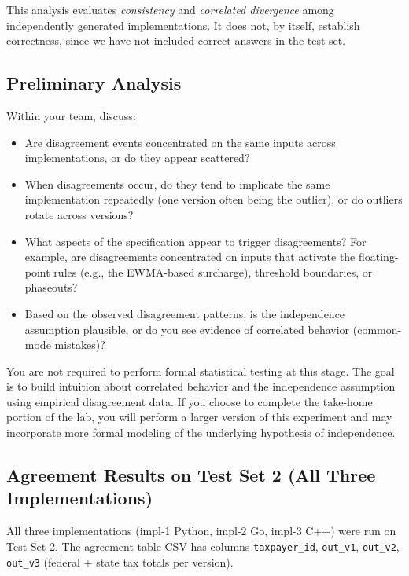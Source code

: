 This analysis evaluates \emph{consistency} and \emph{correlated divergence} among independently generated implementations.
It does not, by itself, establish correctness, since we have not included correct answers in the test set.

\subsection{Preliminary Analysis}

Within your team, discuss:

\begin{itemize}
  \item Are disagreement events concentrated on the same inputs across implementations, or do they appear scattered?
  \item When disagreements occur, do they tend to implicate the same implementation repeatedly (one version often being the outlier), or do outliers rotate across versions?
  \item What aspects of the specification appear to trigger disagreements?
  For example, are disagreements concentrated on inputs that activate the floating-point rules (e.g., the EWMA-based surcharge), threshold boundaries, or phaseouts?
  \item Based on the observed disagreement patterns, is the independence assumption plausible, or do you see evidence of correlated behavior (common-mode mistakes)?
\end{itemize}

You are not required to perform formal statistical testing at this stage.
The goal is to build intuition about correlated behavior and the independence assumption using empirical disagreement data.
If you choose to complete the take-home portion of the lab, you will perform a larger version of this experiment and may incorporate more formal modeling of the underlying hypothesis of independence.

\subsection{Agreement Results on Test Set 2 (All Three Implementations)}

All three implementations (impl-1 Python, impl-2 Go, impl-3 C++) were run on Test Set 2.
The agreement table CSV has columns \texttt{taxpayer\_id}, \texttt{out\_v1}, \texttt{out\_v2}, \texttt{out\_v3} (federal + state tax totals per version).

